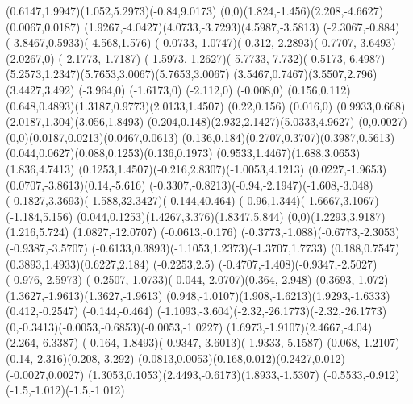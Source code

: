 {    \rcurveto(0.6147,1.9947)(1.052,5.2973)(-0.84,9.0173)
    \rcurveto(0,0)(1.824,-1.456)(2.208,-4.6627)
    \rlineto(0.0067,0.0187)
    \rcurveto(1.9267,-4.0427)(4.0733,-3.7293)(4.5987,-3.5813)
    \rcurveto(-2.3067,-0.884)(-3.8467,0.5933)(-4.568,1.576)
    \rcurveto(-0.0733,-1.0747)(-0.312,-2.2893)(-0.7707,-3.6493)
    \rlineto(2.0267,0)
    \rlineto(-2.1773,-1.7187)
    \rcurveto(-1.5973,-1.2627)(-5.7733,-7.732)(-0.5173,-6.4987)
    \rcurveto(5.2573,1.2347)(5.7653,3.0067)(5.7653,3.0067)
    \rcurveto(3.5467,0.7467)(3.5507,2.796)(3.4427,3.492)
    \rlineto(-3.964,0)
    \rlineto(-1.6173,0)
    \rlineto(-2.112,0)
    \rlineto(-0.008,0)
    \rlineto(0.156,0.112)
    \rcurveto(0.648,0.4893)(1.3187,0.9773)(2.0133,1.4507)
    \rlineto(0.22,0.156)
    \rlineto(0.016,0)
    \rcurveto(0.9933,0.668)(2.0187,1.304)(3.056,1.8493)
    \rcurveto(0.204,0.148)(2.932,2.1427)(5.0333,4.9627)
    \rlineto(0,0.0027)
    \rcurveto(0,0)(0.0187,0.0213)(0.0467,0.0613)
    \rcurveto(0.136,0.184)(0.2707,0.3707)(0.3987,0.5613)
    \rcurveto(0.044,0.0627)(0.088,0.1253)(0.136,0.1973)
    \rcurveto(0.9533,1.4467)(1.688,3.0653)(1.836,4.7413)
    \rcurveto(0.1253,1.4507)(-0.216,2.8307)(-1.0053,4.1213)
    \rcurveto(0.0227,-1.9653)(0.0707,-3.8613)(0.14,-5.616)
    \rcurveto(-0.3307,-0.8213)(-0.94,-2.1947)(-1.608,-3.048)
    \rcurveto(-0.1827,3.3693)(-1.588,32.3427)(-0.144,40.464)
    \rcurveto(-0.96,1.344)(-1.6667,3.1067)(-1.184,5.156)
    \rcurveto(0.044,0.1253)(1.4267,3.376)(1.8347,5.844)
    \rcurveto(0,0)(1.2293,3.9187)(1.216,5.724)
    \rlineto(1.0827,-12.0707)
    \rlineto(-0.0613,-0.176)
    \rcurveto(-0.3773,-1.088)(-0.6773,-2.3053)(-0.9387,-3.5707)
    \rcurveto(-0.6133,0.3893)(-1.1053,1.2373)(-1.3707,1.7733)
    \rcurveto(0.188,0.7547)(0.3893,1.4933)(0.6227,2.184)
    \rlineto(-0.2253,2.5)
    \rcurveto(-0.4707,-1.408)(-0.9347,-2.5027)(-0.976,-2.5973)
    \rcurveto(-0.2507,-1.0733)(-0.044,-2.0707)(0.364,-2.948)
    \rcurveto(0.3693,-1.072)(1.3627,-1.9613)(1.3627,-1.9613)
    \rcurveto(0.948,-1.0107)(1.908,-1.6213)(1.9293,-1.6333)
    \rlineto(0.412,-0.2547)
    \rlineto(-0.144,-0.464)
    \rcurveto(-1.1093,-3.604)(-2.32,-26.1773)(-2.32,-26.1773)
    \rcurveto(0,-0.3413)(-0.0053,-0.6853)(-0.0053,-1.0227)
    \rcurveto(1.6973,-1.9107)(2.4667,-4.04)(2.264,-6.3387)
    \rcurveto(-0.164,-1.8493)(-0.9347,-3.6013)(-1.9333,-5.1587)
    \rcurveto(0.068,-1.2107)(0.14,-2.316)(0.208,-3.292)
    \rcurveto(0.0813,0.0053)(0.168,0.012)(0.2427,0.012)
    \rlineto(-0.0027,0.0027)
    \rcurveto(1.3053,0.1053)(2.4493,-0.6173)(1.8933,-1.5307)
    \rcurveto(-0.5533,-0.912)(-1.5,-1.012)(-1.5,-1.012)
}
